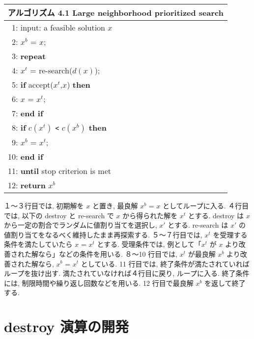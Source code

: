 \begin{table}
\centering
\begin{tabular}{l}\hline
\textbf{アルゴリズム 4.1} Large neighborhood prioritized search 
\cite{%
 hayama19:kobe}\\ \hline
 ~1: input: a feasible solution $x$ \\
 ~2: $x^b$ = $x$; \\
 ~3: \bf{repeat} \\
 ~4: \quad \quad $x^t$ = re-search($d(x)$); \\
 ~5: \quad \quad \textbf{if} accept($x^t$,$x$) \textbf{then} \\
 ~6: \quad \quad \quad \quad $x$ = $x^t$; \\
 ~7: \quad \quad \textbf{end if} \\
 ~8: \quad \quad \textbf{if} $c(x^t)$ \verb|<| $c(x^b)$ \textbf{then} \\
 ~9: \quad \quad \quad \quad $x^b$ = $x^t$; \\
10: \quad \quad \textbf{end if} \\
11: \textbf{until} stop criterion is met \\
12: \textbf{return} $x^b$ \\ \hline
\end{tabular}
\end{table}

１〜３行目では, 初期解を $x$ と置き, 最良解 $x^b$ = $x$ としてループに入る. 
４行目では, 以下の destroy と re-search で $x$ から得られた解を $x^t$ とする. 
destroy は $x$ から一定の割合でランダムに値割り当てを選択し, $x'$ とする. 
re-search は $x'$ の値割り当てをなるべく維持したまま再探索する. 
５〜７行目では, $x^t$ を受理する条件を満たしていたら $x$ = $x^t$ とする. 
受理条件では, 例として「$x^t$ が $x$ より改善された解なら」などの条件を用いる. 
８〜10 行目では, $x^t$ が最良解 $x^b$ より改善された解なら, $x^b$ = $x^t$ としている. 
11 行目では, 終了条件が満たされていればループを抜け出す. 
満たされていなければ４行目に戻り, ループに入る. 
終了条件には, 制限時間や繰り返し回数などを用いる. 
12 行目で最良解 $x^b$ を返して終了する. 

\section{destroy 演算の開発}

